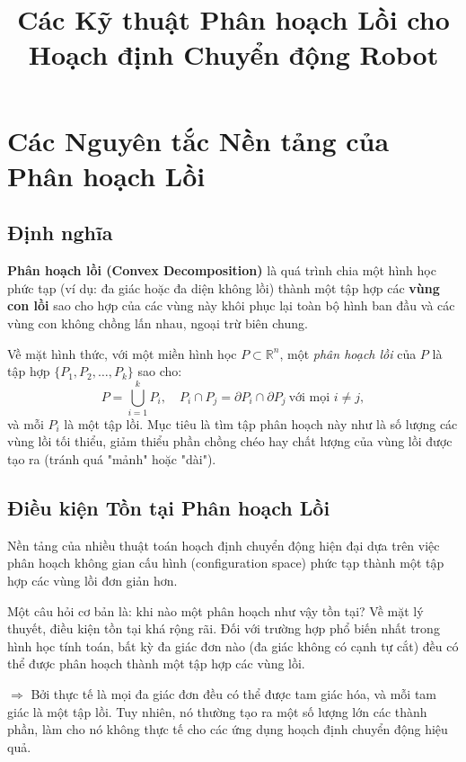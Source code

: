 \documentclass{article}
\title{Các Kỹ thuật Phân hoạch Lồi cho Hoạch định Chuyển động Robot}
\date{}
\begin{document}
 
\raggedbottom
\sloppy
\justifying


\maketitle
\tableofcontents
\newpage


\section{Các Nguyên tắc Nền tảng của Phân hoạch Lồi}

\subsection{Định nghĩa}

\textbf{Phân hoạch lồi (Convex Decomposition)} là quá trình chia một hình học phức tạp (ví dụ: đa giác hoặc đa diện không lồi) 
thành một tập hợp các \textbf{vùng con lồi} sao cho hợp của các vùng này khôi phục lại toàn bộ hình ban đầu và 
các vùng con không chồng lấn nhau, ngoại trừ biên chung.  

Về mặt hình thức, với một miền hình học $P\subset\mathbb{R}^n$, 
một \textit{phân hoạch lồi} của $P$ là tập hợp $\{P_1, P_2, \dots, P_k\}$ sao cho:
\[
P = \bigcup_{i=1}^{k} P_i, \quad 
P_i \cap P_j = \partial P_i \cap \partial P_j \ \text{với mọi } i \ne j,
\]
và mỗi $P_i$ là một tập lồi.  
Mục tiêu là tìm tập phân hoạch này như là số lượng các vùng lồi tối thiểu, giảm thiểu phần chồng chéo hay chất lượng của vùng lồi được tạo ra (tránh quá "mảnh" hoặc "dài").


\subsection{Điều kiện Tồn tại Phân hoạch Lồi}

Nền tảng của nhiều thuật toán hoạch định chuyển động hiện đại dựa trên việc phân hoạch không gian cấu hình (configuration space) phức tạp thành một tập hợp các vùng lồi đơn giản hơn. 

Một câu hỏi cơ bản là: khi nào một phân hoạch như vậy tồn tại? Về mặt lý thuyết, điều kiện tồn tại khá rộng rãi. Đối với trường hợp phổ biến nhất trong hình học tính toán, bất kỳ đa giác đơn nào (đa giác không có cạnh tự cắt) đều có thể được phân hoạch thành một tập hợp các vùng lồi.\cite{keil1985}

$\Rightarrow$ Bởi thực tế là mọi đa giác đơn đều có thể được tam giác hóa, và mỗi tam giác là một tập lồi. Tuy nhiên, nó thường tạo ra một số lượng lớn các thành phần, làm cho nó không thực tế cho các ứng dụng hoạch định chuyển động hiệu quả.\cite{lien2006}
\end{document}
